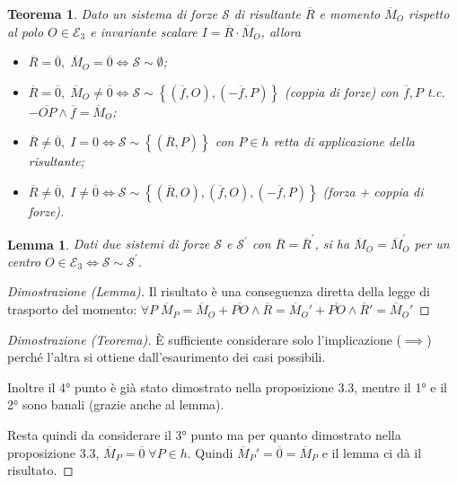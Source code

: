 \documentclass{book}
\theoremstyle{plain}
\newtheorem{teo}{Teorema}[chapter]
\theoremstyle{plain}
\newtheorem*{lemma}{Lemma}
\theoremstyle{plain}
\theoremstyle{plain}
\theoremstyle{plain}
\theoremstyle{definition}
\theoremstyle{remark}
\theoremstyle{definition}
\begin{document}
\begin{teo}
    Dato un sistema di forze $\mathcal{S}$ di risultante $\overline{R}$ e momento $\overline{M}_O$ rispetto al polo $O \in \mathcal{E}_3$ e invariante scalare $I=\overline{R} \cdot \overline{M}_O$, allora
    \begin{itemize}
        \item $\overline{R}=\overline{0}, \; \overline{M}_{O}=\overline{0} \iff \mathcal{S} \sim \emptyset$;
        \item $\overline{R}=\overline{0}, \; \overline{M}_{O} \neq \overline{0} \iff \mathcal{S} \sim \left\{(\overline{f}, O), (-\overline{f}, P)\right\}$ (coppia di forze) con $\overline{f}, P$ t.c. $-\overline{OP} \wedge \overline{f}=\overline{M}_O$;
        \item $\overline{R} \neq \overline{0}, \; I=0 \iff \mathcal{S} \sim\left\{(\overline{R}, P)\right\}$ con $P \in h$ retta di applicazione della risultante;
        \item $\overline{R} \neq \overline{0}, \; I \neq \overline{0} \iff \mathcal{S} \sim \left\{(\overline{R}, O), (\overline{f}, O), (-\overline{f}, P)\right\}$ (forza + coppia di forze).
    \end{itemize}
\end{teo}

\begin{lemma}
    Dati due sistemi di forze $\mathcal{S}$ e $\mathcal{S}^{\prime}$ con $\overline{R}=\overline{R}^{\prime}$, si ha $\overline{M}_{O}=\overline{M}_{O}^{\prime}$ per un centro $O \in \mathcal{E}_{3} \iff \mathcal{S} \sim \mathcal{S}^{\prime}$.
\end{lemma}

\begin{proof}[Dimostrazione (Lemma)]
    Il risultato è una conseguenza diretta della legge di trasporto del momento: $\forall P \;\overline{M}_P=\overline{M}_O+\overline{PO}\wedge\overline{R}=\overline{M}_O'+\overline{PO}\wedge\overline{R}'=\overline{M}_O'$
\end{proof}

\begin{proof}[Dimostrazione (Teorema)]
    È sufficiente considerare solo l'implicazione ($\implies$) perché l'altra si ottiene dall'esaurimento dei casi possibili.

    \noindent Inoltre il 4° punto è già stato dimostrato nella proposizione 3.3, mentre il 1° e il 2° sono banali (grazie anche al lemma).

    \noindent Resta quindi da considerare il 3° punto ma per quanto dimostrato nella proposizione 3.3, $\overline{M}_P=\overline{0} \;\forall P \in h$. Quindi $\overline{M}_P'=\overline{0}=\overline{M}_P$ e il lemma ci dà il risultato.
\end{proof}
\end{document}
